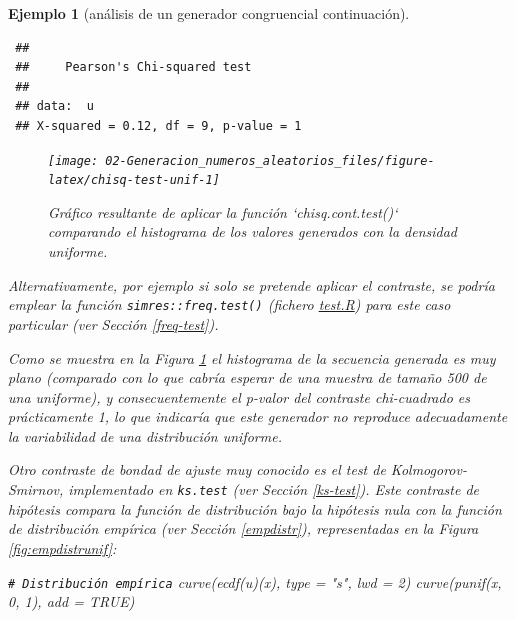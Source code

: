 \documentclass[
]{book}
\newenvironment{Shaded}{\begin{snugshade}}{\end{snugshade}}
\newcommand{\AttributeTok}[1]{\textcolor[rgb]{0.77,0.63,0.00}{#1}}
\newcommand{\CommentTok}[1]{\textcolor[rgb]{0.56,0.35,0.01}{\textit{#1}}}
\newcommand{\ConstantTok}[1]{\textcolor[rgb]{0.00,0.00,0.00}{#1}}
\newcommand{\DecValTok}[1]{\textcolor[rgb]{0.00,0.00,0.81}{#1}}
\newcommand{\FunctionTok}[1]{\textcolor[rgb]{0.00,0.00,0.00}{#1}}
\newcommand{\NormalTok}[1]{#1}
\newcommand{\StringTok}[1]{\textcolor[rgb]{0.31,0.60,0.02}{#1}}
\theoremstyle{break}
\newtheorem{example}{Ejemplo}[chapter]
\theoremstyle{nonumberplain}
\renewcommand{\CommentTok}[1]{\textcolor[rgb]{0.41,0.41,0.41}{\texttt{#1}}}
\begin{document}
\begin{example}[análisis de un generador congruencial continuación]
\begin{verbatim}
 ## 
 ##     Pearson's Chi-squared test
 ## 
 ## data:  u
 ## X-squared = 0.12, df = 9, p-value = 1
\end{verbatim}

\begin{figure}[!htb]

{\centering \texttt{[image: 02-Generacion\_numeros\_aleatorios\_files/figure-latex/chisq-test-unif-1]} 

}

\caption{Gráfico resultante de aplicar la función `chisq.cont.test()` comparando el histograma de los valores generados con la densidad uniforme.}\label{fig:chisq-test-unif}
\end{figure}

Alternativamente, por ejemplo si solo se pretende aplicar el contraste, se podría emplear la función \texttt{simres::freq.test()} (fichero \href{R/test.R}{\emph{test.R}}) para este caso particular (ver Sección \ref{freq-test}).

Como se muestra en la Figura \ref{fig:chisq-test-unif} el histograma de la secuencia generada es muy plano (comparado con lo que cabría esperar de una muestra de tamaño 500 de una uniforme), y consecuentemente el p-valor del contraste chi-cuadrado es prácticamente 1, lo que indicaría que este generador no reproduce adecuadamente la variabilidad de una distribución uniforme.

Otro contraste de bondad de ajuste muy conocido es el test de Kolmogorov-Smirnov, implementado en \texttt{ks.test} (ver Sección \ref{ks-test}).
Este contraste de hipótesis compara la función de distribución bajo la hipótesis nula con la función de distribución empírica (ver Sección \ref{empdistr}), representadas en la Figura \ref{fig:empdistrunif}:

\begin{Shaded}
\begin{Highlighting}[]
\CommentTok{\# Distribución empírica}
\FunctionTok{curve}\NormalTok{(}\FunctionTok{ecdf}\NormalTok{(u)(x), }\AttributeTok{type =} \StringTok{"s"}\NormalTok{, }\AttributeTok{lwd =} \DecValTok{2}\NormalTok{)}
\FunctionTok{curve}\NormalTok{(}\FunctionTok{punif}\NormalTok{(x, }\DecValTok{0}\NormalTok{, }\DecValTok{1}\NormalTok{), }\AttributeTok{add =} \ConstantTok{TRUE}\NormalTok{)}
\end{Highlighting}
\end{Shaded}

\begin{figure}[!htb]


\end{figure}
\end{example}
\end{document}
